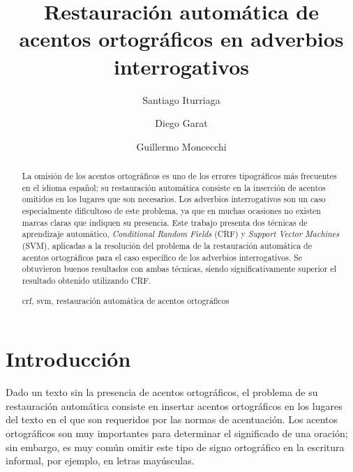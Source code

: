 \documentclass[runningheads,a4paper]{llncs}
\newcommand{\keywords}[1]{\par\addvspace\baselineskip
\noindent\keywordname\enspace\ignorespaces#1}
\begin{document}
\mainmatter  %

\title{Restauración automática de acentos ortográficos en adverbios interrogativos}


\author{Santiago Iturriaga \and Diego Garat \and Guillermo Moncecchi} 

%


\maketitle

\begin{abstract}
La omisión de los acentos ortográficos es uno de los errores tipográficos más frecuentes en el idioma español; su restauración automática consiste en la inserción de acentos  omitidos en los lugares que son necesarios. Los adverbios interrogativos son un caso especialmente dificultoso de este problema, ya que en muchas ocasiones no existen marcas claras que indiquen su presencia. Este trabajo presenta dos técnicas de aprendizaje automático, \emph{Conditional Random Fields} (CRF) y \emph{Support Vector Machines} (SVM), aplicadas a la resolución del problema de la restauración automática de acentos ortográficos para el caso específico de los adverbios interrogativos. Se obtuvieron buenos resultados con ambas t\'ecnicas, siendo significativamente superior el resultado obtenido utilizando CRF.
\keywords{crf, svm, restauración automática de acentos ortográficos}
\end{abstract}

\section{Introducción}
Dado un texto sin la presencia de acentos ortográficos, el problema de su  restauración automática consiste en insertar acentos ortográficos en los lugares del texto en el que son requeridos por las normas de acentuación. Los acentos ortográficos son muy importantes para determinar el significado de una oración; sin embargo, es muy común omitir este tipo de signo ortográfico en la escritura informal, por ejemplo, en letras mayúsculas.
\end{document}
